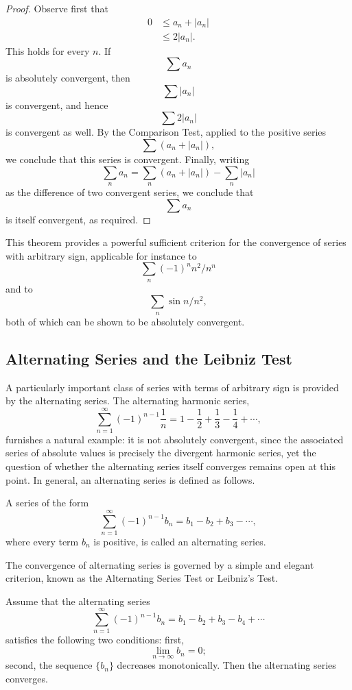 \begin{proof}
Observe first that
\[
\begin{aligned}
0 &\leq a_n + |a_n| \\
&\leq 2 |a_n|.
\end{aligned}
\]
This holds for every $n$. If \[
\sum a_n
\] is absolutely convergent, then \[
\sum |a_n|
\] is convergent, and hence \[
\sum 2 |a_n|
\] is convergent as well. By the Comparison Test, applied to the positive series \[
\sum (a_n + |a_n|),
\] we conclude that this series is convergent. Finally, writing \[
\sum_n a_n = \sum_n (a_n + |a_n|) - \sum_n |a_n|
\] as the difference of two convergent series, we conclude that \[
\sum a_n
\] is itself convergent, as required.
\end{proof}

This theorem provides a powerful sufficient criterion for the convergence of series with arbitrary sign, applicable for instance to
\[
\sum_n (-1)^n n^2 / n^n
\]
and to
\[
\sum_n \sin n / n^2,
\]
both of which can be shown to be absolutely convergent.

\subsection{Alternating Series and the Leibniz Test}

A particularly important class of series with terms of arbitrary sign is provided by the alternating series. The alternating harmonic series,
\[
\sum_{n=1}^{\infty} (-1)^{n-1} \frac{1}{n} = 1 - \frac{1}{2} + \frac{1}{3} - \frac{1}{4} + \cdots,
\]
furnishes a natural example: it is not absolutely convergent, since the associated series of absolute values is precisely the divergent harmonic series, yet the question of whether the alternating series itself converges remains open at this point. In general, an alternating series is defined as follows.

\begin{definition}
A series of the form \[
\sum_{n=1}^{\infty} (-1)^{n-1} b_n = b_1 - b_2 + b_3 - \cdots,
\] where every term $b_n$ is positive, is called an alternating series.
\end{definition}

The convergence of alternating series is governed by a simple and elegant criterion, known as the Alternating Series Test or Leibniz's Test.

\begin{theorem}
Assume that the alternating series \[
\sum_{n=1}^{\infty} (-1)^{n-1} b_n = b_1 - b_2 + b_3 - b_4 + \cdots
\] satisfies the following two conditions: first, \[
\lim_{n \to \infty} b_n = 0;
\] second, the sequence $\{b_n\}$ decreases monotonically. Then the alternating series converges.
\end{theorem}


